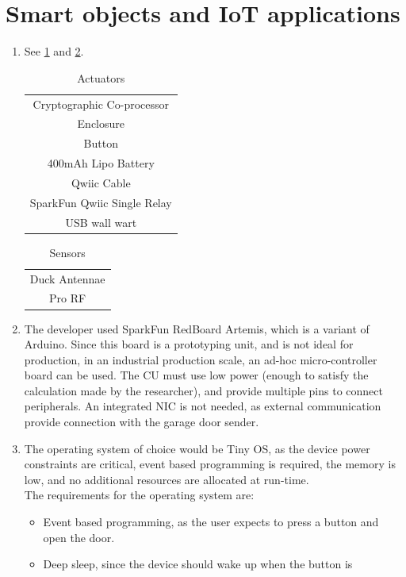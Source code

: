 \documentclass[acmsmall, screen,timestamp,nonacm]{acmart}
\begin{document}
\section{Smart objects and IoT applications} %
\begin{enumerate}
	\item See \ref{tab:acuators} and \ref{tab:sensors}.
		\begin{table}[htpb]
		    \centering
		    \caption{Actuators}
		    \label{tab:acuators}
		    \begin{tabular}{c}
			Cryptographic Co-processor\\
			Enclosure\\
			Button\\
			400mAh Lipo Battery\\
			Qwiic Cable \\
			SparkFun Qwiic Single Relay\\
			USB wall wart\\
		    \end{tabular}
		\end{table}
		\begin{table}[htpb]
		    \centering
		    \caption{Sensors}
		    \label{tab:sensors}
		    \begin{tabular}{c}
			Duck Antennae\\
			Pro RF
		    \end{tabular}
		\end{table}
	\item The developer used SparkFun RedBoard Artemis, which is a variant of
		Arduino. Since this board is a prototyping unit, and is not ideal for
		 production, in an industrial production
		scale, an ad-hoc micro-controller board can be used. The CU must use low power (enough to
		satisfy the calculation made by the researcher), and provide multiple
		pins to connect peripherals. An integrated NIC is not needed, as external communication
		provide connection with the garage door sender. 
	\item The operating system of choice would be Tiny OS, as the device power
		constraints are critical, event based programming is required, the
		memory is low, and no additional resources are allocated at run-time.\\
		The requirements for the operating system are:
		\begin{itemize}
		    \item Event based programming, as the user expects to press a button
				and open the door.
			\item Deep sleep, since the device should wake up when the button is

\end{itemize}
\end{enumerate}
\end{document}
